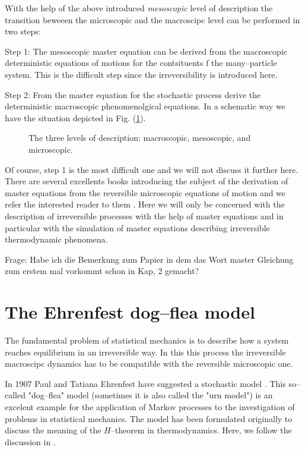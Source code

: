 With the help of the above introduced \textit{mesoscopic} level of description
the transition beweeen the microscopic and the macroscipc level can be
performed in two steps:

Step 1: The mesoscopic master equation can be derived from the macroscopic
deterministic equations of motions for the contsituents f the many--particle
system. This is the difficult step since the irreversibility is introduced
here. 

Step 2: From the master equation for the stochastic process derive the
deterministic macroscopic phenomenolgical equations. In a schematic way we
have the situation depicted in Fig. (\ref{fig:MasterSchema}).

\begin{figure}[htbp]
 \label{fig:MasterSchema} 
 \begin{center}
    
    \caption{The three levels of description: macroscopic, mesoscopic, 
and microscopic.}
    
  \end{center}
\end{figure}

Of course, step 1 is the most difficult one and we will not discuss it further
here. There are several excellents books introducing the subject of the
derivation of master equations from the reversible microscopic equations of
motion and we refer the interested reader to them
\cite{Prigogine,Kreuzer,McLennan}. 
Here we will only be
concerned with the description of irreversible processes with the 
help of master equations and in particular with the simulation of 
master equations describing
irreversible thermodynamic phenomena. 

Frage: Habe ich die Bemerkung zum Papier in dem das Wort master Gleichung zum
erstem mal vorkommt schon in Kap, 2 gemacht?


\section{The Ehrenfest dog--flea model}
The fundamental problem of statistical mechanics is to describe 
how a system reaches
equilibrium in an irreversible way. In this this process the irreversible
macroscipc dynamics has to be compatible with the reversible microscopic one.

In 1907 Paul and Tatiana Ehrenfest have suggested a stochastic model
\cite{Ehrenfest}. This so--called "dog--flea" model (sometimes it is also
called the "urn model") is an excelent example for the application of Markov
processes to the investigation of problems in statistical mechanics. The model
has been formulated originally to discuss the meaning of the $H$--theorem in
thermodynamics. Here, we follow the discussion in \cite{Jancel,KacLogan}.

